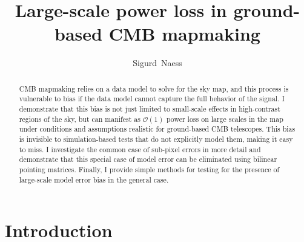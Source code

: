 \documentclass[twocolumn,apj]{aastex63}
\begin{document}
\title{Large-scale power loss in ground-based CMB mapmaking}

\author[0000-0002-4478-7111]{Sigurd~Naess}

\keywords{}

\begin{abstract}
CMB mapmaking relies on a data model to solve for the sky map, and this
process is vulnerable to bias if the data model cannot capture the full
behavior of the signal. I demonstrate that this bias is not just limited to
small-scale effects in high-contrast regions of the sky, but can manifest
as $\mathcal{O}(1)$ power loss on large scales in the map under conditions
and assumptions realistic for ground-based CMB telescopes. This bias is
invisible to simulation-based tests that do not explicitly model them,
making it easy to miss. I investigate the common case of sub-pixel errors
in more detail and demonstrate that this special case of model error can
be eliminated using bilinear pointing matrices. Finally, I provide simple
methods for testing for the presence of large-scale model error bias in
the general case.
\end{abstract}

\section{Introduction}
\end{document}

